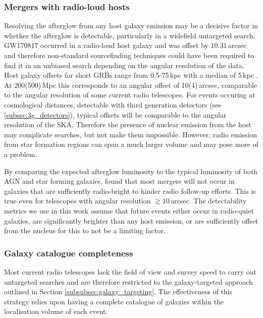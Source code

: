 \subsubsection{Mergers with radio-loud hosts}
\label{subsec:radio_loud_hosts}
Resolving the afterglow from any host galaxy emission may be a decisive factor in whether the afterglow is detectable, particularly in a widefield untargeted search. GW170817 occurred in a radio-loud host galaxy and was offset by $10.31\,$arcsec \citep{2017ApJ...848L..22B,2017ApJ...848L..28L} and therefore non-standard sourcefinding techniques could have been required to find it in an unbiased search depending on the angular resolution of the data. Host galaxy offsets for short GRBs range from 0.5-75\,kpc with a median of 5\,kpc \citep{2010ApJ...708....9F,2013ApJ...776...18F,2014ARA&A..52...43B}. At 200(500)\,Mpc this corresponds to an angular offset of 10(4)\,arcsec, comparable to the angular resolution of some current radio telescopes. For events occuring at cosmological distances, detectable with third generation detectors (see \ref{subsec:3g_detectors}), typical offsets will be comparable to the angular resolution of the SKA. Therefore the presence of nuclear emission from the host may complicate searches, but not make them impossible. However, radio emission from star formation regions can span a much larger volume \citep{2020ApJS..248...25L} and may pose more of a problem.

By comparing the expected afterglow luminosity to the typical luminosity of both AGN and star forming galaxies, \citet{2016ApJ...831..190H} found that most mergers will not occur in galaxies that are sufficiently radio-bright to hinder radio follow-up efforts. This is true even for telescopes with angular resolution $\gtrsim 10\,$arcsec. The detectability metrics we use in this work assume that future events either occur in radio-quiet galaxies, are significantly brighter than any host emission, or are sufficiently offset from the nucleus for this to not be a limiting factor.

\subsubsection{Galaxy catalogue completeness}
\label{subsec:galaxy_cat_completeness}
Most current radio telescopes lack the field of view and survey speed to carry out untargeted searches and are therefore restricted to the galaxy-targeted approach outlined in Section \ref{subsubsec:galaxy_targeting}. The effectiveness of this strategy relies upon having a complete catalogue of galaxies within the localisation volume of each event.

